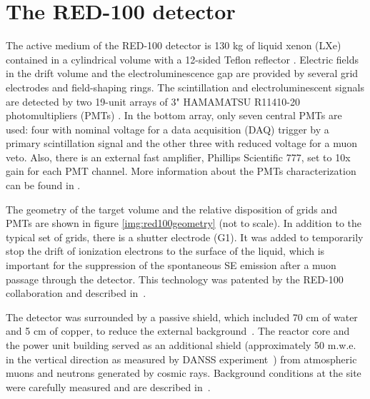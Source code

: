\documentclass[a4paper,11pt]{article}
\begin{document}
\section{The RED-100 detector}
\label{sec:calibr}
The active medium of the RED-100 detector is 130 kg of liquid xenon (LXe) contained in a cylindrical volume with a 12-sided Teflon reflector \cite{Akimov2017}. Electric fields in the drift volume and the electroluminescence gap are provided by several grid electrodes and field-shaping rings. The scintillation and electroluminescent signals are detected by two 19-unit arrays of 3" HAMAMATSU R11410-20 photomultipliers (PMTs) \cite{Akimov:2016eii, Akimov:2017coe}. In the bottom array, only seven central PMTs are used: four with nominal voltage for a data acquisition (DAQ) trigger by a primary scintillation signal and the other three with reduced voltage for a muon veto. Also, there is an external fast amplifier, Phillips Scientific 777, set to 10x gain for each PMT channel. More information about the PMTs characterization can be found in \cite{Akimov:2016eii}.

The geometry of the target volume and the relative disposition of grids and PMTs are shown in figure \ref{img:red100geometry} (not to scale). 
In addition to the typical set of grids, there is a shutter electrode (G1). It was added to temporarily stop the drift of ionization electrons to the surface of the liquid, which is important for the suppression of the spontaneous SE emission after a muon passage through the detector. This technology was patented by the RED-100 collaboration and described in~\cite{RED100_2019}.

The detector was surrounded by a passive shield, which included 70 cm of water and 5 cm of copper, to reduce the external background~\cite{shielding}. The reactor core and the power unit building served as an additional shield (approximately 50 m.w.e. in the vertical direction as measured by DANSS experiment~\cite{Alekseev_2016}) from atmospheric muons and neutrons generated by cosmic rays. Background conditions at the site were carefully measured and are described in~\cite{Akimov_2023}.
\end{document}
